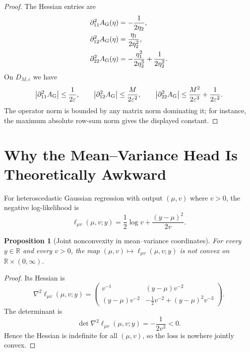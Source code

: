 \documentclass[11pt]{article}
\newtheorem{proposition}[theorem]{Proposition}
\theoremstyle{definition}
\newcommand{\R}{\mathbb{R}}
\begin{document}
\begin{proof}
The Hessian entries are
\begin{align}
  \partial_{11}^2 A_{\rm G}(\eta)
  &= -\frac{1}{2\eta_2},
  \\
  \partial_{12}^2 A_{\rm G}(\eta)
  &= \frac{\eta_1}{2\eta_2^2},
  \\
  \partial_{22}^2 A_{\rm G}(\eta)
  &=
  -\frac{\eta_1^2}{2\eta_2^3}
  +
  \frac{1}{2\eta_2^2}.
\end{align}
On $D_{M,\varepsilon}$ we have
\[
  \big|\partial_{11}^2 A_{\rm G}\big| \le \frac{1}{2\varepsilon},
  \qquad
  \big|\partial_{12}^2 A_{\rm G}\big| \le \frac{M}{2\varepsilon^2},
  \qquad
  \big|\partial_{22}^2 A_{\rm G}\big|
  \le
  \frac{M^2}{2\varepsilon^3} + \frac{1}{2\varepsilon^2}.
\]
The operator norm is bounded by any matrix norm dominating it; for instance,
  the maximum absolute row-sum norm gives the displayed constant.
\end{proof}

\section{Why the Mean--Variance Head Is Theoretically Awkward}

For heteroscedastic Gaussian regression with output $(\mu,v)$ where $v>0$, the
negative log-likelihood is
\begin{equation}
  \ell_{\mu v}(\mu,v;y) = \frac12 \log v + \frac{(y-\mu)^2}{2v}.
\end{equation}

\begin{proposition}[Joint nonconvexity in mean--variance coordinates]
\label{prop:nonconvex-mu-v}
For every $y\in \R$ and every $v>0$, the map $(\mu,v)\mapsto
\ell_{\mu v}(\mu,v;y)$ is not convex on $\R\times (0,\infty)$.
\end{proposition}

\begin{proof}
Its Hessian is
\begin{equation}
  \nabla^2 \ell_{\mu v}(\mu,v;y)
  =
  \begin{pmatrix}
    v^{-1} & (y-\mu)v^{-2} \\
    (y-\mu)v^{-2} & -\frac{1}{2}v^{-2} + (y-\mu)^2 v^{-3}
  \end{pmatrix}.
\end{equation}
The determinant is
\begin{equation}
  \det \nabla^2 \ell_{\mu v}(\mu,v;y)
  =
  -\frac{1}{2v^3} < 0.
\end{equation}
Hence the Hessian is indefinite for all $(\mu,v)$, so the loss is nowhere
jointly convex.
\end{proof}
\end{document}
